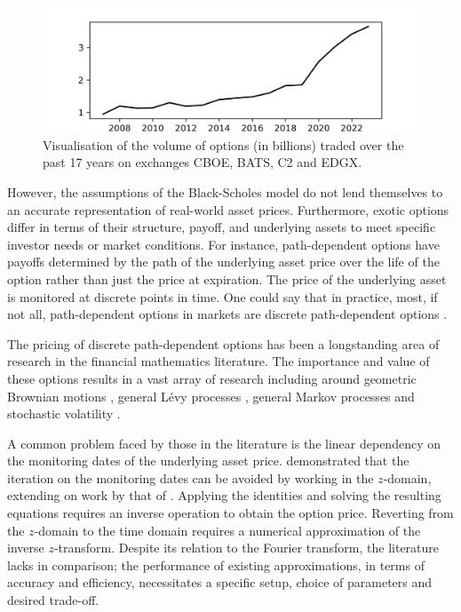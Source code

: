 \documentclass[a4paper]{report}
\begin{document}
\begin{figure}[h]
	\centering
	\includegraphics[width=0.7\linewidth]{images/options_volume.png}
	\captionsetup{justification=centering}
    \caption{Visualisation of the volume of options (in billions) traded over the past 17 years on exchanges CBOE, BATS, C2 and EDGX.}
    \label{fig:volume_of_options}
\end{figure}
However, the assumptions of the Black-Scholes model do not lend themselves to an accurate representation of real-world asset prices. Furthermore, exotic options differ in terms of their structure, payoff, and underlying assets to meet specific investor needs or market conditions. For instance, path-dependent options have payoffs determined by the path of the underlying asset price over the life of the option rather than just the price at expiration. The price of the underlying asset is monitored at discrete points in time. One could say that in practice, most, if not all, path-dependent options in markets are discrete path-dependent options \citep{kou2007discrete}.

The pricing of discrete path-dependent options has been a longstanding area of research in the financial mathematics literature. The importance and value of these options results in a vast array of research including around geometric Brownian motions \citep{lu2017improved, guardasoni2020mellin}, general L\'evy processes \citep{fang2009novel, fusai2016spitzer, phelan2018fourier, chen2021sinc, levendorskii2022sinh}, general Markov processes \citep{cui2021pricing, zhang2023general} and stochastic volatility \citep{soleymani2019pricing, kirkby2020efficient}.

A common problem faced by those in the literature is the linear dependency on the monitoring dates of the underlying asset price. \citet{fusai2016spitzer} demonstrated that the iteration on the monitoring dates can be avoided by working in the $z$-domain, extending on work by that of \citet{carr1999option}. Applying the \citet{spitzer1957wiener} identities and solving the resulting equations requires an inverse operation to obtain the option price. Reverting from the $z$-domain to the time domain requires a numerical approximation of the inverse $z$-transform. Despite its relation to the Fourier transform, the literature lacks in comparison; the performance of existing approximations, in terms of accuracy and efficiency, necessitates a specific setup, choice of parameters and desired trade-off.
\end{document}

